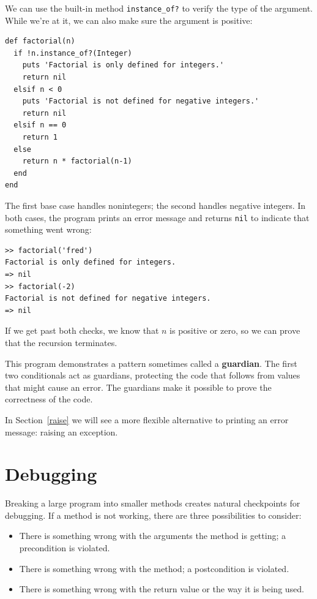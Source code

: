 \documentclass[10pt]{book}
\begin{document}
We can use the built-in method {\tt instance\_of?} to verify the type
of the argument.  While we're at it, we can also make sure the
argument is positive:

\begin{verbatim}
def factorial(n)
  if !n.instance_of?(Integer)
    puts 'Factorial is only defined for integers.'
    return nil
  elsif n < 0
    puts 'Factorial is not defined for negative integers.'
    return nil
  elsif n == 0
    return 1
  else
    return n * factorial(n-1)
  end
end
\end{verbatim}
%
The first base case handles nonintegers; the
second handles negative integers.  In both cases, the program prints
an error message and returns {\tt nil} to indicate that something
went wrong:

\begin{verbatim}
>> factorial('fred')
Factorial is only defined for integers.
=> nil
>> factorial(-2)
Factorial is not defined for negative integers.
=> nil
\end{verbatim}
% 
If we get past both checks, we know that $n$ is positive or
zero, so we can prove that the recursion terminates.

This program demonstrates a pattern sometimes called a {\bf guardian}.
The first two conditionals act as guardians, protecting the code that
follows from values that might cause an error.  The guardians make it
possible to prove the correctness of the code.

In Section~\ref{raise} we will see a more flexible alternative to printing
an error message: raising an exception.


\section{Debugging}
\label{factdebug}

Breaking a large program into smaller methods creates natural
checkpoints for debugging.  If a method is not
working, there are three possibilities to consider:

\begin{itemize}

\item There is something wrong with the arguments the method
is getting; a precondition is violated.

\item There is something wrong with the method; a postcondition
is violated.

\item There is something wrong with the return value or the
way it is being used.

\end{itemize}
\end{document}
